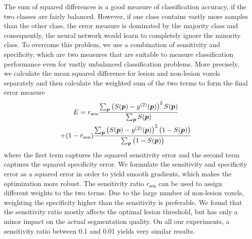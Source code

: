 The sum of squared differences is a good measure of classification accuracy, if
the two classes are fairly balanced. However, if one class contains vastly more
samples than the other class, the error measure is dominated by the majority
class and consequently, the neural network would learn to completely ignore the
minority class. To overcome this problem, we use a combination of sensitivity
and specificity, which are two measures that are suitable to measure
classification performance even for vastly unbalanced classification problems.
More precisely, we calculate the mean squared difference for lesion and
non-lesion voxels separately and then calculate the weighted sum of the two
terms to form the final error measure
\begin{multline} 
E = r_\text{sen}\frac{\textstyle\sum_{\vect{p}} \left(S(\vect{p}) -
y^{(2)}(\vect{p})\right)^2 S(\vect{p})}{\textstyle\sum_{\vect{p}} S(\vect{p})}
 \\  +
(1-r_\text{sen})\frac{\textstyle\sum_{\vect{p}} \left(S(\vect{p}) -
y^{(2)}(\vect{p})\right)^2 \big(1 - S(\vect{p})\big)}{%
\textstyle\sum_{\vect{p}}\big(1 - S(\vect{p})\big)}
\end{multline}
where the first term captures the squared sensitivity error and the second term
captures the squared specificity error. We formulate the sensitivity and
specificity error as a squared error in order to yield smooth gradients, which
makes the optimization more robust. The sensitivity ratio
$r_\text{sen}$ can be used to assign different weights to the two terms. Due to
the large number of non-lesion voxels, weighting the specificity higher than the
sensitivity is preferable. We found that the sensitivity ratio mostly affects
the optimal lesion threshold, but has only a minor impact on the actual segmentation
quality. On all our experiments, a sensitivity ratio between 0.1 and 0.01 yields
very similar results.

